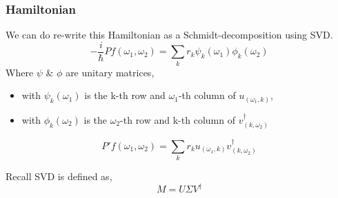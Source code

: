 \documentclass{beamer}
\begin{document}
\begin{frame}
    \frametitle{Hamiltonian}
    
\end{frame}
\begin{frame}
    We can do re-write this Hamiltonian as a Schmidt-decomposition using SVD.
    \begin{equation}
    -\frac{i}{\hbar}P f(\omega_1,\omega_2) = \sum_k r_k \psi_k(\omega_1) \phi_k(\omega_2)
    \end{equation}
    Where $ \psi $ \& $\phi $ are unitary matrices,
    \begin{itemize}
        \item with $ \psi_k(\omega_1) $ is the k-th row and $\omega_1$-th column of $u_{(\omega_1, k)}$,
        \item with $ \phi_k(\omega_2) $ is the $\omega_2$-th row and k-th column of $v^\dagger_{(k,\omega_2)}$
    \end{itemize}
    \begin{equation}
        P' f(\omega_1, \omega_2) = \sum_k r_k u_{(\omega_1, k)} v_{(k, \omega_2)}^\dagger
    \end{equation}
\end{frame}

\begin{frame}
    Recall SVD is defined as,
    \begin{equation}
    M=U \Sigma V^\dagger 
    \end{equation}
\end{frame}
\end{document}
